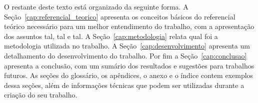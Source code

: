 O restante deste texto está organizado da seguinte forma. A Seção~\ref{cap:referencial_teorico} apresenta os conceitos básicos do referencial teórico necessário para um melhor entendimento do trabalho, com a apresentação dos assuntos tal, tal e tal. A Seção~\ref{cap:metodologia} relata qual foi a metodologia utilizada no trabalho. A Seção~\ref{cap:desenvolvimento} apresenta um detalhamento do  desenvolvimento do trabalho. Por fim a Seção~\ref{cap:conclusao} apresenta a conclusão, com um sumário dos resultados e sugestões para trabalhos futuros. As seções do glossário, os apêndices, o anexo e o índice contem exemplos dessa seções, além de informações técnicas que podem ser utilizadas durante a criação do seu trabalho.